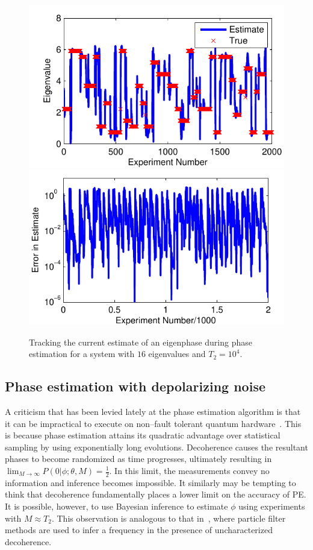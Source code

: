 \documentclass[aps,pra,amsmath,twocolumn,amssymb,superscriptaddress]{revtex4-1}
\begin{document}





\begin{figure}
    \begin{centering}
\includegraphics[width=0.4\linewidth]{Errtrack1.pdf}
\hspace{5mm}
        \includegraphics[width=0.4\linewidth]{Errtrack2.pdf}
    \end{centering}
    \caption{\label{fig:Errplot}
Tracking the current estimate of an eigenphase  during phase estimation for a system with $16$ eigenvalues and $T_2=10^4$.
    }
\end{figure}

\subsection{Phase estimation with depolarizing noise}
A criticism that has been levied lately at the phase estimation algorithm is that it can be impractical to execute on non--fault tolerant quantum hardware~\cite{PMS+14,MBL+14}.  This is because phase estimation attains its quadratic advantage over statistical sampling by using exponentially long evolutions.  Decoherence causes the resultant phases to become randomized as time progresses, ultimately resulting in
$\lim_{M\rightarrow \infty} P(0|\phi;\theta,M) = \frac{1}{2}$.
In this limit, the measurements convey no information and inference becomes impossible.  It similarly may be tempting to think that decoherence fundamentally places a lower limit on the accuracy of PE.  It is possible, however, to use Bayesian inference to estimate $\phi$ using experiments with $M \approx T_2$.  This observation is analogous to that in~\cite{granade_robust_2012}, where particle filter methods are used to infer a  frequency in the presence of uncharacterized decoherence.
\end{document}

